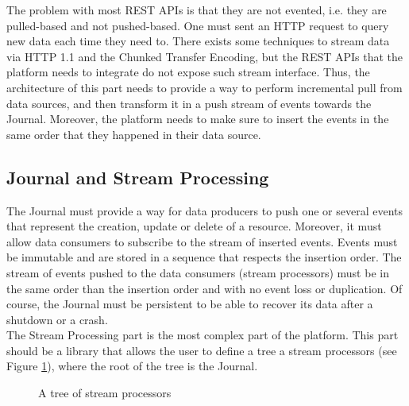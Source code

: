 The problem with most REST APIs is that they are not evented, i.e. they are pulled-based and not pushed-based. 
One must sent an HTTP request to query new data each time they need to. There exists some techniques to stream data via HTTP 1.1 and the 
Chunked Transfer Encoding, but the REST APIs that the platform needs to integrate do not expose such stream interface. 
Thus, the architecture of this part needs to provide a way to perform incremental pull from data sources, and then transform
it in a push stream of events towards the Journal. Moreover, the platform needs to make sure to insert the events in the same
order that they happened in their data source.


\subsection{Journal and Stream Processing}

The Journal must provide a way for data producers to push one or several events that represent the creation, update or 
delete of a resource. Moreover, it must allow data consumers to subscribe to the stream of inserted events. Events must be
immutable and are stored in a sequence that respects the insertion order. The stream of events pushed to the data consumers
(stream processors) must be in the same order than the insertion order and with no event loss or duplication. Of course, the Journal must be persistent to
be able to recover its data after a shutdown or a crash.
\\

The Stream Processing part is the most complex part of the platform. This part should be a library that allows the user
to define a tree a stream processors (see Figure \ref{fig:tree}), where the root of the tree is the Journal. 

\begin{figure}[h]
  \begin{center} 
    \caption{A tree of stream processors}
    \label{fig:tree}
  \end{center}
\end{figure}

